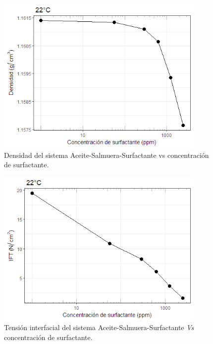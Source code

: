 \begin{figure}
    \centering
    \includegraphics[width=0.9\textwidth]{R_plot/Rplot25.png}
    \caption[Densidad del sistema A-S-S.]{Densidad del sistema Aceite-Salmuera-Surfactante vs concentración de surfactante.}
    \label{fig:denASS}
\end{figure}

\begin{figure}
    \centering
    \includegraphics[width=0.9\textwidth]{R_plot/Rplot26.png}
    \caption[IFT del sistema A-S-S.]{Tensión interfacial del sistema Aceite-Salmuera-Surfactante \emph{Vs} concentración de surfactante.}
    \label{fig:IFTASS}
\end{figure}
